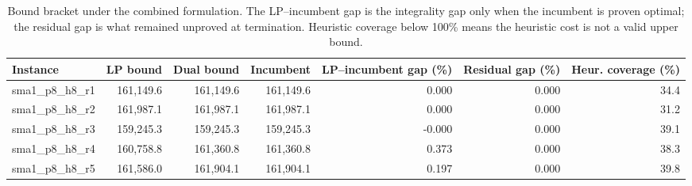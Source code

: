 \begin{table}[htbp]
\centering\small
\caption{Bound bracket under the combined formulation. The LP--incumbent gap is the integrality gap only when the incumbent is proven optimal; the residual gap is what remained unproved at termination. Heuristic coverage below 100\% means the heuristic cost is not a valid upper bound.}
\label{tab:strength_bounds_bracket}
\begin{tabular}{lrrrrrr}
\toprule
Instance & LP bound & Dual bound & Incumbent & LP--incumbent gap (\%) & Residual gap (\%) & Heur. coverage (\%) \\
\midrule
sma1\_p8\_h8\_r1 & 161,149.6 & 161,149.6 & 161,149.6 & 0.000 & 0.000 & 34.4 \\
sma1\_p8\_h8\_r2 & 161,987.1 & 161,987.1 & 161,987.1 & 0.000 & 0.000 & 31.2 \\
sma1\_p8\_h8\_r3 & 159,245.3 & 159,245.3 & 159,245.3 & -0.000 & 0.000 & 39.1 \\
sma1\_p8\_h8\_r4 & 160,758.8 & 161,360.8 & 161,360.8 & 0.373 & 0.000 & 38.3 \\
sma1\_p8\_h8\_r5 & 161,586.0 & 161,904.1 & 161,904.1 & 0.197 & 0.000 & 39.8 \\
\bottomrule
\end{tabular}
\end{table}
